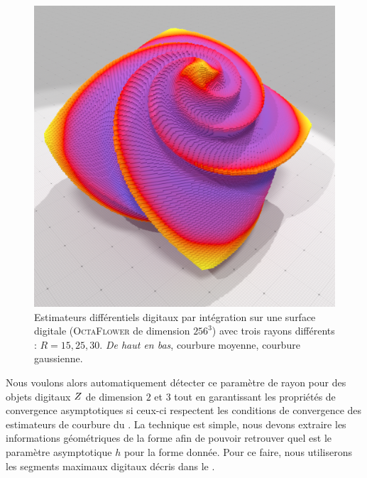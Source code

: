 \begin{figure}[ht]
\begin{center}
  \includegraphics[width=.30\linewidth]{images/Curvature/Octa256_Gauss_R_30_0001}
\end{center}\vspace{-0.5cm}
  \caption{Estimateurs différentiels digitaux par intégration sur une surface digitale (\textsc{OctaFlower} de dimension $256^3$) avec trois rayons différents : $R = 15, 25, 30$. \emph{De haut en bas}, courbure moyenne, courbure gaussienne. \label{fig:digital-II-octa-scale}}
\end{figure}

Nous voulons alors automatiquement détecter ce paramètre de rayon pour des
objets digitaux $Z$ de dimension $2$ et $3$ tout en garantissant les
propriétés de convergence asymptotiques si ceux-ci respectent les conditions de
convergence des estimateurs de courbure du .
La technique est simple, nous devons extraire les informations géométriques de
la forme afin de pouvoir retrouver quel est le paramètre asymptotique $h$ pour
la forme donnée. Pour ce faire, nous utiliserons les segments maximaux digitaux décris
dans le .
%
%
